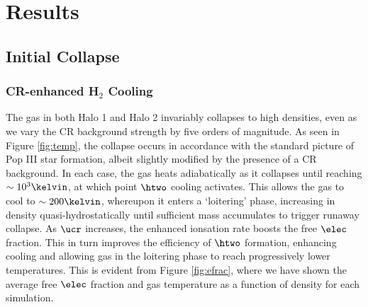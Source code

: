 \section{Results}
\label{sec:results}
\subsection{Initial Collapse}
\subsubsection{CR-enhanced H$_2$ Cooling}
\label{sec:initial_collapse}

The gas in both Halo 1 and Halo 2 invariably collapses to high densities, even as we vary the CR background strength by five orders of magnitude. As seen in Figure \ref{fig:temp}, the collapse occurs in accordance with the standard picture of Pop III star formation, albeit slightly modified by the presence of a CR background.  In each case, the gas heats adiabatically as it collapses until reaching $\sim10^3\kelvin$, at which point $\htwo$ cooling activates.  This allows the gas to cool to $\sim200\kelvin$, whereupon it enters a `loitering' phase, increasing in density quasi-hydrostatically until sufficient mass accumulates to trigger runaway collapse.  As $\ucr$ increases, the enhanced ionsation rate boosts the free $\elec$ fraction.  This in turn improves the efficiency of $\htwo$ formation, enhancing cooling and allowing gas in the loitering phase to reach progressively lower temperatures.  This is evident from Figure \ref{fig:efrac}, where we have shown the average free $\elec$ fraction and gas temperature as a function of density for each simulation.
